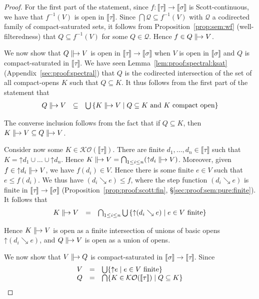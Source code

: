 \documentclass[%
  a4paper,
  UKenglish,
  cleveref,
  autoref,
  thm-restate,
  numberwithinsect,
]{lipics-v2021}
\newcommand\sle\subseteq
\newcommand\up{\mathord{\uparrow}}
\newcommand\I[1]{\llbracket #1 \rrbracket} %
\newcommand\Open{\mathcal{O}}		%
\newcommand\K{\mathcal{K}}		%
\newcommand\defrealto{\mathrel\parallel\joinrel\to}
\newcommand\realto{\mathrel{\defrealto}}
\newcommand\PT{\tau}		%
\newcommand\PTbis{\sigma}	%
\newcommand\step{\searrow}
\begin{document}
\begin{proof}
For the first part of the statement,
since $f \colon \I\PT \to \I\PTbis$ is Scott-continuous,
we have that $f^{-1}(V)$ is open in $\I{\PT}$.
Since $\bigcap\mathcal{Q} \sle f^{-1}(V)$
with $\mathcal{Q}$ a codirected family of compact-saturated sets,
it follows from Proposition~\ref{prop:sem:wf} (well-filteredness)
that $Q \sle f^{-1}(V)$ for some $Q \in \mathcal{Q}$.
Hence $f \in Q \realto V$.

We now show that $Q \realto V$ is open in $\I\PT \to \I\PTbis$
when $V$ is open in $\I\PTbis$ and $Q$ is compact-saturated in $\I\PT$.
We have seen Lemma~\ref{lem:proof:spectral:ksat} (Appendix~\ref{sec:proof:spectral})
that $Q$ is the codirected intersection of the set of all compact-opens
$K$ such that $Q \sle K$.
It thus follows from the first part of the statement that
\[
\begin{array}{l l l}
  Q \realto V
& \sle
& \bigcup\left\{
  K \realto V
  \mid \text{$Q \sle K$ and $K$ compact open}
  \right\}
\end{array}
\]

\noindent
The converse inclusion follows from the fact that if $Q \sle K$,
then $K \realto V \sle Q \realto V$.

Consider now some $K \in \K\Open(\I\PT)$.
There are finite $d_1,\dots,d_n \in \I\PT$
such that $K = \up d_1 \cup \dots \cup \up d_n$.
Hence $K \realto V = \bigcap_{1 \leq i \leq n} (\up d_i \realto V)$.
Moreover, given $f \in \up d_i \realto V$,
we have $f(d_i) \in V$.
Hence there is some finite $e \in V$
such that $e \leq f(d_i)$.
We thus have $(d_i \step e) \leq f$,
where the step function $(d_i \step e)$ is finite in $\I\PT \to \I\PTbis$
(Proposition~\ref{prop:proof:scott:fin}, \S\ref{sec:proof:sem:pure:finite}).
It follows that 
\[
\begin{array}{l l l}
  K \realto V
& =
& \bigcap_{1 \leq i \leq n}
  \bigcup \left\{
  \up(d_i \step e)
  \mid
  \text{$e \in V$ finite}
  \right\}
\end{array}
\]

Hence $K \realto V$ is open as a finite intersection of unions
of basic opens $\up(d_i \step e)$,
and $Q \realto V$ is open as a union of opens.

We now show that $V \realto Q$ is compact-saturated in $\I\PTbis \to \I\PT$.
Since
\[
\begin{array}{r c l}
  V
& =
& \bigcup \{ \up e \mid \text{$e \in V$ finite} \}
\\
%
  Q
& =
& \bigcap \{ K \in \K\Open(\I\PT) \mid Q \sle K \}
\end{array}
\]


\end{proof}
\end{document}
